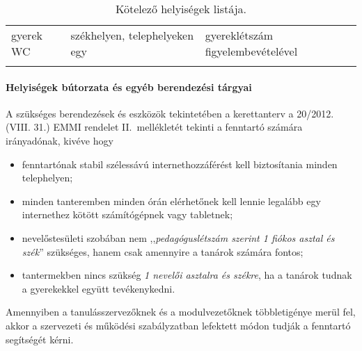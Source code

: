 \begin{longtable}{@{}p{4cm}|p{4cm}|p{6cm}@{}}
    \\ \hline
    gyerek WC                     & székhelyen, telephelyeken egy       &
   gyereklétszám figyelembevételével
    \\

    \caption{Kötelező helyiségek listája.}
    \label{tbl:helyisegek}

\end{longtable}

\vfill\eject

\paragraph{Helyiségek bútorzata és egyéb berendezési tárgyai}

A szükséges
berendezések és eszközök tekintetében a kerettanterv a	20/2012. (VIII. 31.)
EMMI rendelet
II.~mellékletét tekinti a fenntartó számára irányadónak, kivéve hogy
\begin{itemize}
    \item fenntartónak stabil szélessávú internethozzáférést kell
          biztosítania minden telephelyen;
    \item minden tanteremben minden órán elérhetőnek kell lennie legalább egy
          internethez kötött számítógépnek vagy tabletnek;
    \item nevelőstesületi szobában nem ,,\emph{pedagóguslétszám szerint 1
              fiókos
              asztal és szék}'' szükséges, hanem csak amennyire a tanárok
          számára fontos;
    \item tantermekben nincs szükség \emph{1 nevelői asztalra és székre}, ha a
          tanárok tudnak a gyerekekkel együtt tevékenykedni.
\end{itemize}

Amennyiben a tanulásszervezőknek és a modulvezetőknek többletigénye merül fel,
akkor a szervezeti és működési szabályzatban lefektett módon tudják a fenntartó segítségét kérni.